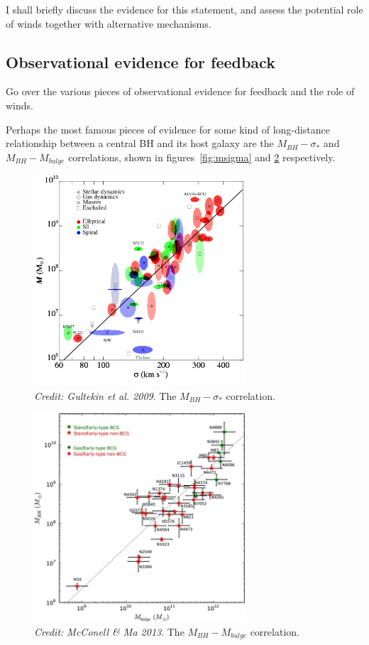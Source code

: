 I shall briefly discuss the evidence for this statement, and 
assess the potential role of winds together with alternative mechanisms.

\subsection{Observational evidence for feedback}

{
\color{blue}
Go over the various pieces of observational evidence for feedback
and the role of winds.
}
\bigskip

Perhaps the most famous pieces of evidence for some kind of long-distance 
relationship between a central BH and its host galaxy are the 
$M_{BH}-\sigma_*$ and $M_{BH}-M_{bulge}$ correlations, shown in figures~\ref{fig:msigma}
and \ref{fig:mbulge} respectively.

\nocite{mcconnell2013,gultekin2009}
\begin{figure}
\centering
\includegraphics[width=0.7\textwidth]{figures/02-outflows/msigma.png}
\caption
{
{\sl Credit: Gultekin et al. 2009}. 
The $M_{BH}-\sigma_*$ correlation.
} 
\label{fig:mbulge}
\end{figure}

\begin{figure}
\centering
\includegraphics[width=0.7\textwidth]{figures/02-outflows/mbulge.jpg}
\caption
{
{\sl Credit: McConell \& Ma 2013}. 
The $M_{BH}-M_{bulge}$ correlation.
} 
\label{fig:mbulge}
\end{figure}

